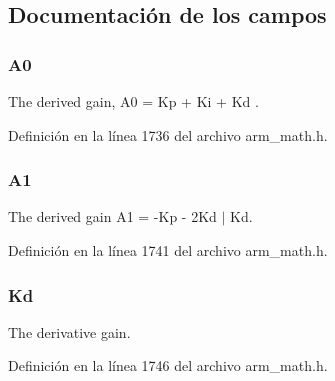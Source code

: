 \subsection{Documentación de los campos}
\subsubsection[{\texorpdfstring{A0}{A0}}]{ A0}\hypertarget{structarm__pid__instance__q15_a1aa73268c65cea0c7bc66bb70ff35205}{}\label{structarm__pid__instance__q15_a1aa73268c65cea0c7bc66bb70ff35205}
The derived gain, A0 = Kp + Ki + Kd . 

Definición en la línea 1736 del archivo arm\+\_\+math.\+h.

\subsubsection[{\texorpdfstring{A1}{A1}}]{ A1}\hypertarget{structarm__pid__instance__q15_aeb897c84724b56948e4222aca8d0e1f4}{}\label{structarm__pid__instance__q15_aeb897c84724b56948e4222aca8d0e1f4}
The derived gain A1 = -\/\+Kp -\/ 2\+Kd $\vert$ Kd. 

Definición en la línea 1741 del archivo arm\+\_\+math.\+h.

\subsubsection[{\texorpdfstring{Kd}{Kd}}]{ Kd}\hypertarget{structarm__pid__instance__q15_abf38d18de1e16bc6d86846fedf8534fe}{}\label{structarm__pid__instance__q15_abf38d18de1e16bc6d86846fedf8534fe}
The derivative gain. 

Definición en la línea 1746 del archivo arm\+\_\+math.\+h.


